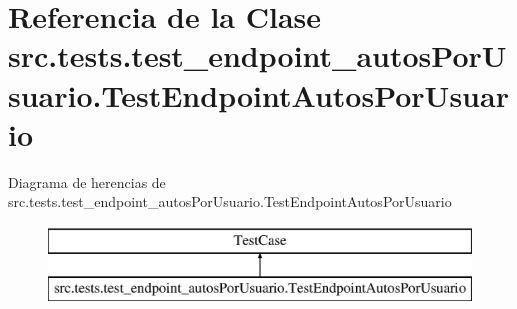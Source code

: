 \hypertarget{classsrc_1_1tests_1_1test__endpoint__autos_por_usuario_1_1_test_endpoint_autos_por_usuario}{\section{Referencia de la Clase src.\-tests.\-test\-\_\-endpoint\-\_\-autos\-Por\-Usuario.\-Test\-Endpoint\-Autos\-Por\-Usuario}
\label{classsrc_1_1tests_1_1test__endpoint__autos_por_usuario_1_1_test_endpoint_autos_por_usuario}
}
Diagrama de herencias de src.\-tests.\-test\-\_\-endpoint\-\_\-autos\-Por\-Usuario.\-Test\-Endpoint\-Autos\-Por\-Usuario\begin{figure}[H]
\begin{center}
\leavevmode
\includegraphics[height=2.000000cm]{classsrc_1_1tests_1_1test__endpoint__autos_por_usuario_1_1_test_endpoint_autos_por_usuario}
\end{center}
\end{figure}
